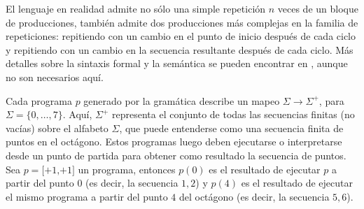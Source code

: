 
El lenguaje en realidad admite no sólo una simple repetición $n$ veces de un bloque de producciones, también admite dos producciones más complejas en la familia de repeticiones: repitiendo con un cambio en el punto de inicio después de cada ciclo y repitiendo con un cambio en la secuencia resultante después de cada ciclo. Más detalles sobre la sintaxis formal y la semántica se pueden encontrar en \cite{amalric2017language}, aunque no son necesarios aquí. 


Cada programa $p$ generado por la gramática describe un mapeo $\Sigma\to\Sigma^+$, para $\Sigma=\{0,\dots,7\}$. Aquí, $\Sigma^+$ representa el conjunto de todas las secuencias finitas (no vacías) sobre el alfabeto $\Sigma$, que puede entenderse como una secuencia finita de puntos en el octágono. Estos programas luego deben ejecutarse o interpretarse desde un punto de partida para obtener como resultado la secuencia de puntos. Sea $p = \textrm{[+1,+1]}$ un programa, entonces $p(0)$ es el resultado de ejecutar $p$ a partir del punto $0$ (es decir, la secuencia $1,2$) y $p(4)$ es el resultado de ejecutar el mismo programa a partir del punto $4$ del octágono (es decir, la secuencia $5,6$).


